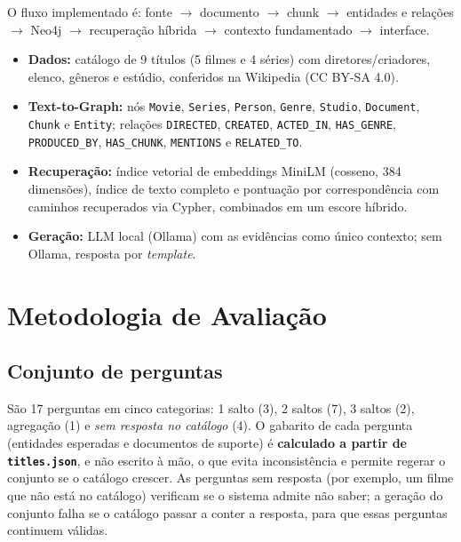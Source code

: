 \documentclass[12pt]{article}
\begin{document}
O fluxo implementado é: fonte $\rightarrow$ documento $\rightarrow$ chunk $\rightarrow$
entidades e relações $\rightarrow$ Neo4j $\rightarrow$ recuperação híbrida $\rightarrow$ contexto
fundamentado $\rightarrow$ interface.

\begin{itemize}
  \item \textbf{Dados:} catálogo de 9 títulos (5 filmes e 4 séries) com diretores/criadores, elenco,
        gêneros e estúdio, conferidos na Wikipedia (CC BY-SA 4.0).
  \item \textbf{Text-to-Graph:} nós \texttt{Movie}, \texttt{Series}, \texttt{Person}, \texttt{Genre},
        \texttt{Studio}, \texttt{Document}, \texttt{Chunk} e \texttt{Entity}; relações \texttt{DIRECTED},
        \texttt{CREATED}, \texttt{ACTED\_IN}, \texttt{HAS\_GENRE}, \texttt{PRODUCED\_BY},
        \texttt{HAS\_CHUNK}, \texttt{MENTIONS} e \texttt{RELATED\_TO}.
  \item \textbf{Recuperação:} índice vetorial de embeddings MiniLM (cosseno, 384 dimensões), índice de texto completo e
        pontuação por correspondência com caminhos recuperados via Cypher, combinados em um escore híbrido.
  \item \textbf{Geração:} LLM local (Ollama) com as evidências como único contexto; sem Ollama,
        resposta por \emph{template}.
\end{itemize}

\section{Metodologia de Avaliação}

\subsection{Conjunto de perguntas}
São 17 perguntas em cinco categorias: 1 salto (3), 2 saltos (7), 3 saltos (2), agregação (1) e
\emph{sem resposta no catálogo} (4). O gabarito de cada pergunta (entidades esperadas e documentos de
suporte) é \textbf{calculado a partir de \texttt{titles.json}}, e não escrito à mão, o que evita
inconsistência e permite regerar o conjunto se o catálogo crescer. As perguntas sem resposta
(por exemplo, um filme que não está no catálogo) verificam se o sistema admite não saber; a geração
do conjunto falha se o catálogo passar a conter a resposta, para que essas perguntas continuem válidas.
\end{document}
